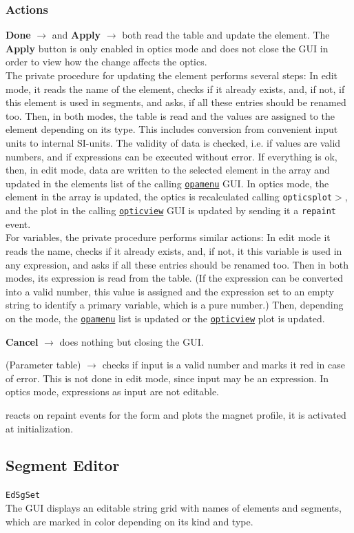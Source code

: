 \documentclass[12pt]{article}
\newcommand\code[1]{{\tt #1}}
\newcommand{\ofld}[1]{\colorbox{black!15}{{\bf #1}}}
\newcommand{\ofldx}[1]{\colorbox{black!15}{(#1)}}
\newcommand\guico[1]{{\color{blue}\code{#1}}}
\newcommand{\unico}[1]{{\color{burntorange}\code{#1}}}
\newcommand{\evcod}[2]{\ofld{#1} $\rightarrow$ \guico{#2}}
\newcommand{\evcodx}[2]{\ofldx{#1} $\rightarrow$ \guico{#2}}
\newcommand{\prcod}[2]{\opauni{#1}$>$\unico{#2}}
\newcommand{\opagui}[1]{\colorbox{blue!20}{\code{#1}}}
\newcommand{\oguih}[2]{\subsection{\label{#2}#1}{\Huge\opagui{#2}}\\}
\newcommand{\ogui}[1]{\hyperref[#1]{\opagui{#1}}}
\newcommand{\opauni}[1]{\colorbox{orange!30}{\code{#1}}}
\newcommand{\desc}[1]{#1}
\newcommand{\act}[1]{\subsubsection*{Actions} #1}
\begin{document}
\act{

\evcod{Done}{butOKClick} and \evcod{Apply}{butApplyClick} both read the table and update the element. The \ofld{Apply} button is only enabled in optics mode and does not close the GUI in order to view how the change affects the optics.\\ 
The private procedure \guico{SetElem} for updating the element performs several steps:
In edit mode, it reads the name of the element, checks if it already exists, and, if not, if this element is used in segments, and asks, if all these entries should be renamed too. Then, in both modes, the table is read and the values are assigned to the element depending on its type. This includes conversion from convenient input units to internal SI-units. The validity of data is checked, i.e. if values are valid numbers, and if expressions can be executed without error. If everything is ok, then, in edit mode, data are written to the selected element in the \unico{Elem} array and updated in the elements list of the calling \ogui{opamenu} GUI. In optics mode, the element in the \unico{Ella} array is updated, the optics is recalculated calling \prcod{opticsplot}{OpticReCalc}, and the plot in the calling \ogui{opticview} GUI is updated by sending it a \code{repaint} event.\\
For variables, the private procedure \guico{SetVar} performs similar actions: In edit mode it reads the name, checks if it already exists, and, if not, it this variable is used in any expression, and asks if all these entries should be renamed too. Then in both modes, its expression is read from the table. (If the expression can be converted into a valid number, this value is assigned and the expression set to an empty string to identify a primary variable, which is a pure number.) Then, depending on the mode, the \ogui{opamenu} list is updated or the \ogui{opticview} plot is updated.

\evcod{Cancel}{butCancelClick} does nothing but closing the GUI.

\evcodx{Parameter table}{TabDrawCell} checks if input is a valid number and marks it red in case of error. This is not done in edit mode, since input may be an expression. In optics mode, expressions as input are not editable.

\guico{ppaint} reacts on repaint events for the form and plots the magnet profile, it is activated at initialization.
}


\oguih{Segment Editor}{EdSgSet}

\desc{
The GUI displays an editable string grid with names of elements and segments, which are marked in color depending on its kind and type. 
}
\end{document}
